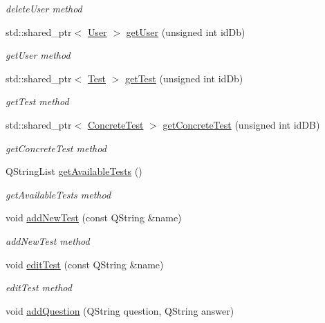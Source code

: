 \begin{DoxyCompactItemize}
\begin{DoxyCompactList}\small\item\em delete\+User method \end{DoxyCompactList}\item 
std\+::shared\+\_\+ptr$<$ \hyperlink{class_user}{User} $>$ \hyperlink{class_main_class_ae144428058aa2a87061044ee2515d3cb}{get\+User} (unsigned int id\+Db)
\begin{DoxyCompactList}\small\item\em get\+User method \end{DoxyCompactList}\item 
std\+::shared\+\_\+ptr$<$ \hyperlink{class_test}{Test} $>$ \hyperlink{class_main_class_a0ef6e83729dc97a723a07efd99a2d1b3}{get\+Test} (unsigned int id\+Db)
\begin{DoxyCompactList}\small\item\em get\+Test method \end{DoxyCompactList}\item 
std\+::shared\+\_\+ptr$<$ \hyperlink{class_concrete_test}{Concrete\+Test} $>$ \hyperlink{class_main_class_aaa60dd5448bb004623189f66335dcc9b}{get\+Concrete\+Test} (unsigned int id\+DB)
\begin{DoxyCompactList}\small\item\em get\+Concrete\+Test method \end{DoxyCompactList}\item 
Q\+String\+List \hyperlink{class_main_class_a5620620d6b98a1be73a52fb80982fd9e}{get\+Available\+Tests} ()
\begin{DoxyCompactList}\small\item\em get\+Available\+Tests method \end{DoxyCompactList}\item 
void \hyperlink{class_main_class_a138aab7a71f0fb928022d1e8ddb7064b}{add\+New\+Test} (const Q\+String \&name)
\begin{DoxyCompactList}\small\item\em add\+New\+Test method \end{DoxyCompactList}\item 
void \hyperlink{class_main_class_aca1ce710f27a6abdda8310799a750f78}{edit\+Test} (const Q\+String \&name)
\begin{DoxyCompactList}\small\item\em edit\+Test method \end{DoxyCompactList}\item 
void \hyperlink{class_main_class_a23153f89d54388726288e652fb9f1577}{add\+Question} (Q\+String question, Q\+String answer)

\end{DoxyCompactItemize}
